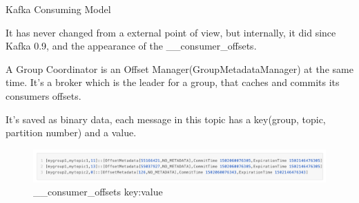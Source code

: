 \begin{frame}[plain,t]{Kafka Consuming Model} %
	 \\  \vspace{2ex}
	
	It has never changed from a external point of view, but internally, it did since Kafka 0.9, and the appearance of the {\color{red}\_\_consumer\_offsets}. 
	
	\vspace{2ex}
A Group Coordinator is an Offset Manager(GroupMetadataManager) at the same time. It’s a broker which is the leader for a group, that caches and commits its consumers offsets.
	
		\vspace{2ex}
	It’s saved as binary data, each message in this topic has a key({\color{red}group, topic, partition number}) and a value.
	
	\begin{figure}
		\centering
		\includegraphics[width=1\linewidth]{image/0308}
		\caption{\_\_consumer\_offsets key:value}
		\label{fig:0308}
	\end{figure}
	
	


\end{frame}

